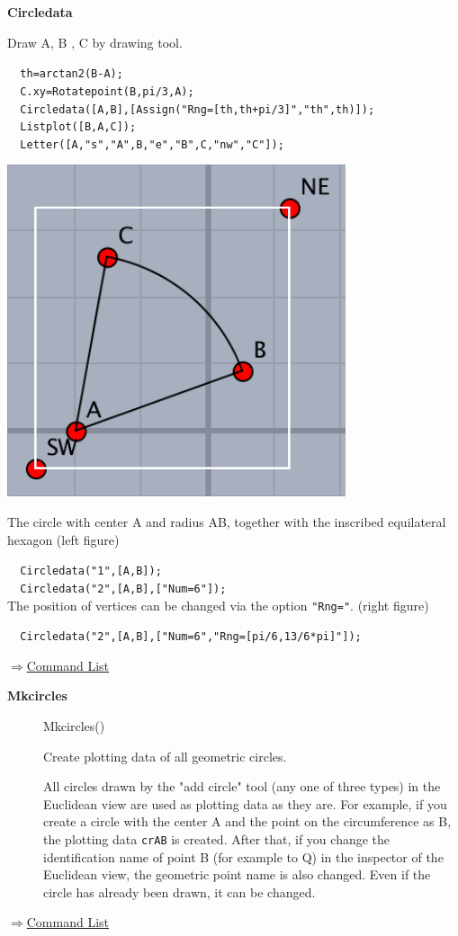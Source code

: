 \documentclass[papersize,a4paper,12pt]{article}
\newenvironment{cmd}[2]{
\hypertarget{#2}{}
\begin{center}{\bf\large #1}\end{center}
\begin{description}
}{
\end{description}
\begin{flushright} \hyperlink{functionlist}{$\Rightarrow$Command List}\end{flushright}
}
\newcommand{\itemket}[1]{
\item[\Ltab{27mm}{#1}]
}
\begin{document}
\begin{cmd}{Circledata}{circledata}
Draw A, B , C by drawing tool.

\verb|  th=arctan2(B-A);| \\
\verb|  C.xy=Rotatepoint(B,pi/3,A);|\\
\verb|  Circledata([A,B],[Assign("Rng=[th,th+pi/3]","th",th)]);|\\
\verb|  Listplot([B,A,C]);|\\
\verb|  Letter([A,"s","A",B,"e","B",C,"nw","C"]);|

\begin{center}
\includegraphics[bb=0.00 0.00 180.01 177.01,width=4cm"] {Fig/circledata3.pdf}\hspace{12mm}  
\end{center}

The circle with center A and radius AB, together with the inscribed equilateral hexagon (left figure)

\verb|  Circledata("1",[A,B]);|\\
\verb|  Circledata("2",[A,B],["Num=6"]);|\\ 

The position of vertices can be changed via the option \verb|"Rng="|. (right figure)

\verb|  Circledata("2",[A,B],["Num=6","Rng=[pi/6,13/6*pi]"]);|

\begin{center}
 \hspace{20mm}
\end{center}

\end{cmd}

\begin{cmd}{Mkcircles}{mkcircles}
\itemket{Usage}Mkcircles()
\itemket{Description}Create plotting data of all geometric circles. 
\itemket{Details}
All circles drawn by the "add circle" tool (any one of three types) in the Euclidean view are used as plotting data as they are. 
For example, if you create a circle with the center A and the point on the circumference as B, the plotting data \verb|crAB| is created. 
After that, if you change the identification name of point B (for example to Q) in the inspector of the Euclidean view, the geometric point name is also changed. 
Even if the circle has already been drawn, it can be changed. \\
\end{cmd}
\end{document}
